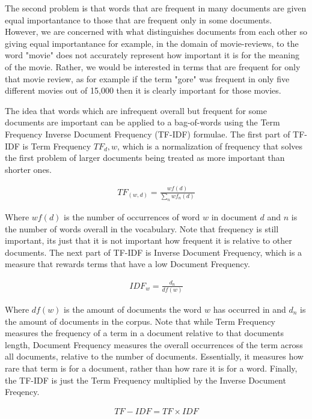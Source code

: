 The second problem is that words that are frequent in many documents are given equal importantance to those that are frequent only in some documents. However, we are concerned with what distinguishes documents from each other so giving equal importantance  for example, in the domain of movie-reviews, to the word "movie" does not accurately represent how important it is for the meaning of the movie. Rather, we would be interested in terms that are frequent for only that movie review, as for example if the term "gore" was frequent in only five different movies out of 15,000 then it is clearly important for those movies. 


The idea that words which are infrequent overall but frequent for some documents are important can be applied to a bag-of-words using the Term Frequency Inverse Document Frequency (TF-IDF) formulae. The first part of TF-IDF is Term Frequency $TF_d,w$, which is a normalization of frequency that solves the first problem of larger documents being treated as more important than shorter ones. 

\begin{align*}
TF_{(w, d)} =  \frac{{wf}(d)}{\sum_{n} {wf}_n(d)} 
\end{align*}

Where ${wf}(d)$ is the number of occurrences of word $w$ in document $d$ and $n$ is the number of words overall in the vocabulary. Note that frequency is still important, its just that it is not important how frequent it is relative to other documents.  The next part of TF-IDF is Inverse Document Frequency, which is a measure that rewards terms that have a low Document Frequency. 

\begin{align*}
IDF_{w} =  \frac{d_n}{{df}(w)} 
\end{align*}

Where ${df}(w)$ is the amount of documents the word $w$ has occurred in and $d_n$ is the amount of documents in the corpus. Note that while Term Frequency measures the frequency of a term in a document relative to that documents length, Document Frequency measures the overall occurrences of the term across all documents, relative to the number of documents. Essentially, it measures how rare that term is for a document, rather than how rare it is for a word. Finally, the TF-IDF is just the Term Frequency multiplied by the Inverse Document Freqency.

\begin{align*}
{TF-IDF} = TF \times IDF
\end{align*}


